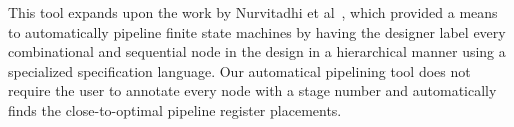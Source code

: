 This tool expands upon the work by Nurvitadhi et al~\cite{hoe:syn}, which provided a means to automatically pipeline finite state machines by having the designer label every combinational and sequential node in the design in a hierarchical manner using a specialized specification language. Our automatical pipelining tool does not require the user to annotate every node with a stage number and automatically finds the close-to-optimal pipeline register placements.


